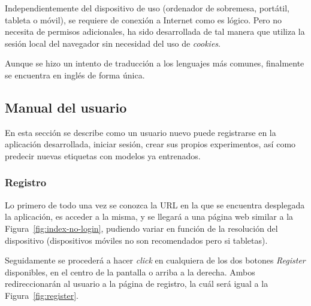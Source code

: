 Independientemente del dispositivo de uso (ordenador de sobremesa, portátil, tableta o móvil), se requiere de conexión a Internet como es lógico. Pero no necesita de permisos adicionales, ha sido desarrollada de tal manera que utiliza la sesión local del navegador sin necesidad del uso de \textit{cookies}.

Aunque se hizo un intento de traducción a los lenguajes más comunes, finalmente se encuentra en inglés de forma única.

\subsection{Manual del usuario}
En esta sección se describe como un usuario nuevo puede registrarse en la aplicación desarrollada, iniciar sesión, crear sus propios experimentos, así como predecir nuevas etiquetas con modelos ya entrenados.

\subsubsection{Registro}

Lo primero de todo una vez se conozca la URL en la que se encuentra desplegada la aplicación, es acceder a la misma, y se llegará a una página web similar a la Figura~\ref{fig:index-no-login}, pudiendo variar en función de la resolución del dispositivo (dispositivos móviles no son recomendados pero si tabletas). 


Seguidamente se procederá a hacer \textit{click} en cualquiera de los dos botones \textit{Register} disponibles, en el centro de la pantalla o arriba a la derecha. Ambos redireccionarán al usuario a la página de registro, la cuál será igual a la Figura~\ref{fig:register}.

